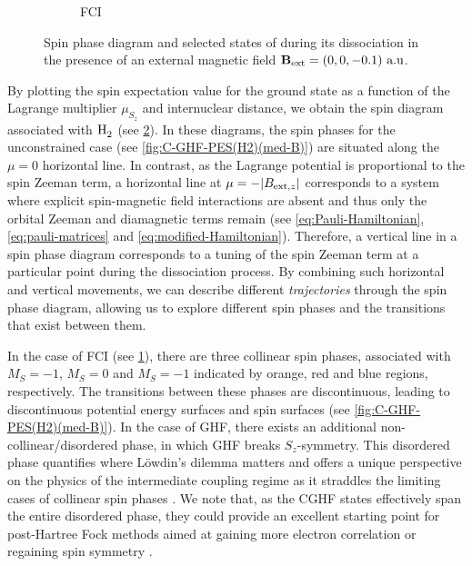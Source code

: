 \documentclass[journal=jctc,manuscript=article]{achemso}
\begin{document}
\begin{figure}
\begin{subfigure}[]{0.45\textwidth}
                \caption{FCI}
                \label{fig:FCI-spin-phase-diagram-H2}
            \end{subfigure}
            \caption{
                Spin phase diagram and selected states of  during its dissociation in the presence of an external magnetic field $\vb{B}_{\text{ext}} = (0,0,-0.1)\text{ a.u}$.
            }
            \label{fig:spin-phase-diagram-H2-med-B}
        \end{figure}

        By plotting the spin expectation value for the ground state as a function of the Lagrange multiplier $\mu_{S_z}$ and internuclear distance, we obtain the spin diagram associated with $\ce{H2}$ (see \cref{fig:spin-phase-diagram-H2-med-B}). 
        In these diagrams, the spin phases for the unconstrained case (see \cref{fig:C-GHF-PES(H2)(med-B)}) are situated along the $\mu=0$ horizontal line. 
        In contrast, as the Lagrange potential is proportional to the spin Zeeman term, a horizontal line at $\mu = - \abs{B_{\text{ext}, z}}$ corresponds to a system where explicit spin-magnetic field interactions are absent and thus only the orbital Zeeman and diamagnetic terms remain (see \cref{eq:Pauli-Hamiltonian}, \cref{eq:pauli-matrices} and \cref{eq:modified-Hamiltonian}).
        Therefore, a vertical line in a spin phase diagram corresponds to a tuning of the spin Zeeman term at a particular point during the dissociation process.
        By combining such horizontal and vertical movements, we can describe different \emph{trajectories} through the spin phase diagram, allowing us to explore different spin phases and the transitions that exist between them.

        In the case of FCI (see \cref{fig:FCI-spin-phase-diagram-H2}), there are three collinear spin phases, associated with $M_S=-1$, $M_S=0$ and $M_S=-1$ indicated by orange, red and blue regions, respectively.
        The transitions between these phases are discontinuous, leading to discontinuous potential energy surfaces and spin surfaces (see \cref{fig:C-GHF-PES(H2)(med-B)}). 
        In the case of GHF, there exists an additional non-collinear/disordered phase, in which GHF breaks $S_z$-symmetry. 
        This disordered phase quantifies where Löwdin's dilemma matters and offers a unique perspective on the physics of the intermediate coupling regime as it straddles the limiting cases of collinear spin phases \cite{sachdev2011a}.
        We note that, as the CGHF states effectively span the entire disordered phase, they could provide an excellent starting point for post-Hartree Fock methods aimed at gaining more electron correlation or regaining spin symmetry \cite{Thom.2009, Sundstrom.2014, Burton.2021}.
\end{document}
